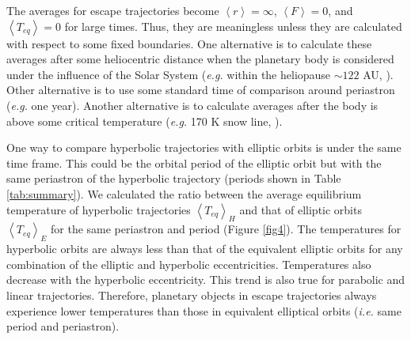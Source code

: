 \documentclass[a4paper,fleqn,usenatbib]{mnras}
\begin{document}

The averages for escape trajectories become $\left<r\right>=\infty$, $\left<F\right>=0$, and $\left<T_{eq}\right>=0$ for large times. Thus, they are meaningless unless they are calculated with respect to some fixed boundaries. One alternative is to calculate these averages after some heliocentric distance when the planetary body is considered under the influence of the Solar System (\emph{e.g.} within the heliopause $\sim122$ AU, \citet{2017ApJ...834..197C}). Other alternative is to use some standard time of comparison around periastron (\emph{e.g.} one year). Another alternative is to calculate averages after the body is above some critical temperature (\emph{e.g.} 170 K snow line, \citet{2008ApJ...673..502K}).


One way to compare hyperbolic trajectories with elliptic orbits is under the same time frame. This could be the orbital period of the elliptic orbit but with the same periastron of the hyperbolic trajectory (periods shown in Table \ref{tab:summary}). We calculated the ratio between the average equilibrium temperature of hyperbolic trajectories $\left<T_{eq}\right>_H$ and that of elliptic orbits $\left<T_{eq}\right>_E$ for the same periastron and period (Figure \ref{fig4}). The temperatures for hyperbolic orbits are always less than that of the equivalent elliptic orbits for any combination of the elliptic and hyperbolic eccentricities. Temperatures also decrease with the hyperbolic eccentricity. This trend is also true for parabolic and linear trajectories. Therefore, planetary objects in escape trajectories always experience lower temperatures than those in equivalent elliptical orbits (\emph{i.e.} same period and periastron).

\end{document}
